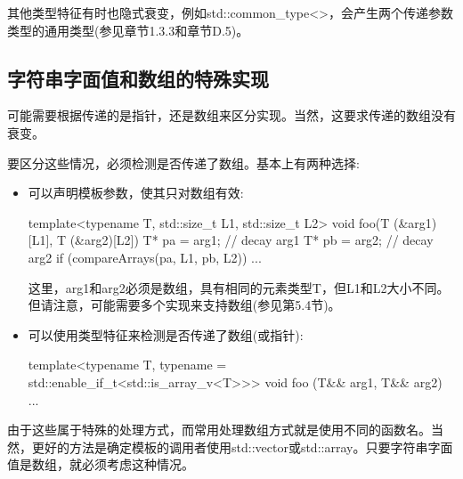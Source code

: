 其他类型特征有时也隐式衰变，例如std::common\_type<>，会产生两个传递参数类型的通用类型(参见章节1.3.3和章节D.5)。

\subsection{字符串字面值和数组的特殊实现}

可能需要根据传递的是指针，还是数组来区分实现。当然，这要求传递的数组没有衰变。

要区分这些情况，必须检测是否传递了数组。基本上有两种选择:

\begin{itemize}
\item 
可以声明模板参数，使其只对数组有效:

\begin{cpp}
template<typename T, std::size_t L1, std::size_t L2>
void foo(T (&arg1)[L1], T (&arg2)[L2])
{
	T* pa = arg1; // decay arg1
	T* pb = arg2; // decay arg2
	if (compareArrays(pa, L1, pb, L2)) {
		...
	}
}
\end{cpp}

这里，arg1和arg2必须是数组，具有相同的元素类型T，但L1和L2大小不同。但请注意，可能需要多个实现来支持数组(参见第5.4节)。

\item 
可以使用类型特征来检测是否传递了数组(或指针):

\begin{cpp}
template<typename T,
		 typename = std::enable_if_t<std::is_array_v<T>>>
void foo (T&& arg1, T&& arg2)
{
	...
}
\end{cpp}
\end{itemize}

由于这些属于特殊的处理方式，而常用处理数组方式就是使用不同的函数名。当然，更好的方法是确定模板的调用者使用std::vector或std::array。只要字符串字面值是数组，就必须考虑这种情况。


















